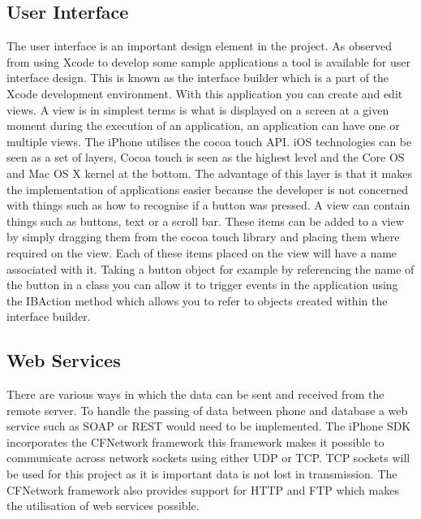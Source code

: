 \documentclass[12pt]{article}
\begin{document}
\subsection{User Interface}
The user interface is an important design element in the project. As observed from using Xcode to develop some sample applications a tool is available for user interface design. This is known as the interface builder which is a part of the Xcode development environment. With this application you can create and edit views. A view is in simplest terms is what is displayed on a screen at a given moment during the execution of an application, an application can have one or multiple views. The iPhone utilises the cocoa touch API. iOS technologies can be seen as a set of layers, Cocoa touch is seen as the highest level and the Core OS and Mac OS X kernel at the bottom. The advantage of this layer is that it makes the implementation of applications easier because the developer is not concerned with things such as how to recognise if a button was pressed.  A view can contain things such as buttons, text or a scroll bar. These items can be added to a view by simply dragging them from the cocoa touch library and placing them where required on the view. Each of these items placed on the view will have a name associated with it. Taking a button object for example by referencing the name of the button in a class you can allow it to trigger events in the application using the IBAction method which allows you to refer to objects created within the interface builder. 

\newpage

\subsection{Web Services}

There are various ways in which the data can be sent and received from the remote server.  To handle the passing of data between phone and database a web service such as SOAP or REST would need to be implemented. The iPhone SDK incorporates the CFNetwork framework this framework makes it possible to communicate across network sockets using either UDP or TCP. TCP sockets will be used for this project as it is important data is not lost in transmission.  The CFNetwork framework also provides support for HTTP and FTP which makes the utilisation of web services possible.

\paragraph{}
\label{par:First Paragraph}
\end{document}
